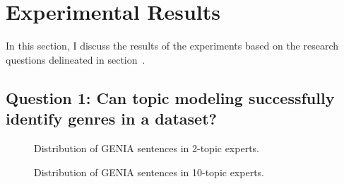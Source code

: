 


\section{Experimental Results}\label{sec:results}


In this section, I discuss the results of the experiments based on the research questions delineated in section~\label{sec:quest}.

\subsection*{Question 1: Can topic modeling successfully identify genres in a dataset?}

\begin{figure}[!t]
    \centering
 \caption{Distribution of GENIA sentences in 2-topic experts.}\label{fig:distsent2}
 \end{figure}
 
 
 
 
 \begin{figure}[!t]
    \centering
 \caption{Distribution of GENIA sentences in 10-topic experts.}\label{fig:distsent10}
 \end{figure}

